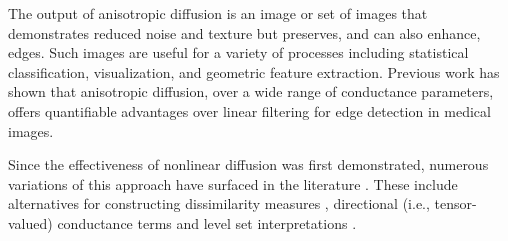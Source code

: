 The output of anisotropic diffusion is an image or set of images that
demonstrates reduced noise and texture but preserves, and can also enhance,
edges.  Such images are useful for a variety of  processes including
statistical classification, visualization, and geometric feature extraction.
Previous work has shown \cite{Whitaker-thesis} that anisotropic diffusion, over
a wide range of conductance parameters, offers quantifiable advantages over
linear filtering for edge detection in medical images.

Since the effectiveness of nonlinear diffusion was first demonstrated, numerous
variations of this approach have surfaced in the literature \cite{Romeny1994}.
These include alternatives for constructing dissimilarity measures
\cite{Sapiro1996}, directional (i.e., tensor-valued) conductance terms
\cite{Weickert1996,Alvarez1994} and level set interpretations
\cite{Whitaker2001}.
